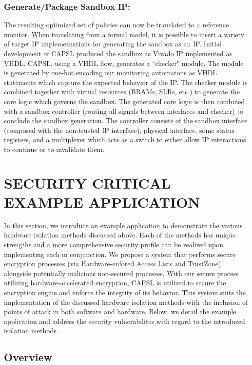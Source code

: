 \documentclass[sigconf]{acmart}
\theoremstyle{plain}
\theoremstyle{remark}
\begin{document}
\subsubsection{Generate/Package Sandbox IP:}
The resulting optimized set of policies can now be translated to a reference monitor. When translating from a formal model, it is possible to insert a variety of target IP implemetnations for generating the sandbox as an IP. Initial development of CAPSL produced the sandbox as Vivado IP implemented as VHDL. CAPSL, using a VHDL flow, generates a ``checker" module. The module is generated by one-hot encoding our monitoring automatons as VHDL statements which capture the expected behavior of the IP. The checker module is combined together with virtual resources (BRAMs, SLRs, etc.) to generate the core logic which governs the sandbox. The generated core logic is then combined with a sandbox controller (routing all signals between interfaces and checker) to conclude the sandbox generation. The controller consists of the sandbox interface (composed with the non-trusted IP interface), physical interface, some status registers, and a multiplexer which acts as a switch to either allow IP interactions to continue or to invalidate them.



\section{SECURITY CRITICAL EXAMPLE APPLICATION} \label{sec:application}

In this section, we introduce an example application to demonstrate the various hardware isolation methods discussed above. Each of the methods has unique strengths and a more comprehensive security profile can be realized upon implementing each in conjunction. We propose a system that performs secure encryption processes (via Hardware-enfored Access Lists and TrustZone) alongside potentially malicious non-secured processes. With our secure process utilizing hardware-accelerated encryption, CAPSL is utilized to secure the encryption engine and enforce the integrity of its behavior. This system suits the implementation of the discussed hardware isolation methods with the inclusion of points of attack in both software and hardware. Below, we detail the example application and address the security vulnerabilites with regard to the introduced isolation methods.


\subsection{Overview}
\end{document}
